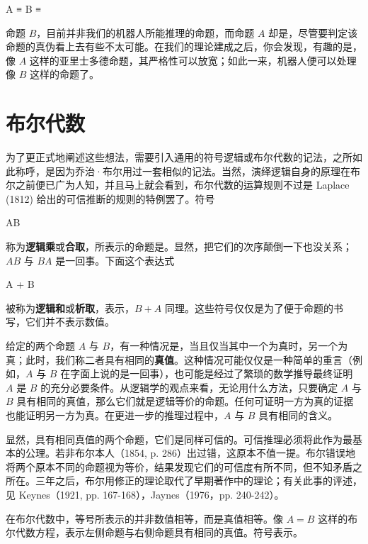 \startformula
\startalign
\NC A \NC ≡ \NR
\NC B \NC ≡ \NR
\stopalign
\stopformula

命题 $B$，目前并非我们的机器人所能推理的命题，而命题 $A$ 却是，尽管要判定该命题的真伪看上去有些不太可能。在我们的理论建成之后，你会发现，有趣的是，像 $A$ 这样的亚里士多德命题，其严格性可以放宽；如此一来，机器人便可以处理像 $B$ 这样的命题了。

\section{布尔代数}

为了更正式地阐述这些想法，需要引入通用的符号逻辑或布尔代数的记法，之所如此称呼，是因为乔治·布尔用过一套相似的记法。当然，演绎逻辑自身的原理在布尔之前便已广为人知，并且马上就会看到，布尔代数的运算规则不过是 Laplace (1812) 给出的可信推断的规则的特例罢了。符号

\placeformula
\startformula
AB
\stopformula

称为{\bf 逻辑乘}或{\bf 合取}，所表示的命题是。显然，把它们的次序颠倒一下也没关系；$AB$ 与 $BA$ 是一回事。下面这个表达式

\placeformula
\startformula
A + B
\stopformula

被称为{\bf 逻辑和}或{\bf 析取}，表示，$B + A$ 同理。这些符号仅仅是为了便于命题的书写，它们并不表示数值。

给定的两个命题 $A$ 与 $B$，有一种情况是，当且仅当其中一个为真时，另一个为真；此时，我们称二者具有相同的{\bf 真值}。这种情况可能仅仅是一种简单的重言（例如，$A$ 与 $B$ 在字面上说的是一回事），也可能是经过了繁琐的数学推导最终证明 $A$ 是 $B$ 的充分必要条件。从逻辑学的观点来看，无论用什么方法，只要确定 $A$ 与 $B$ 具有相同的真值，那么它们就是逻辑等价的命题。任何可证明一方为真的证据也能证明另一方为真。在更进一步的推理过程中，$A$ 与 $B$ 具有相同的含义。

显然，具有相同真值的两个命题，它们是同样可信的。可信推理必须将此作为最基本的公理。若非布尔本人（1854, p. 286）出过错，这原本不值一提。布尔错误地将两个原本不同的命题视为等价，结果发现它们的可信度有所不同，但不知矛盾之所在。三年之后，布尔用修正的理论取代了早期著作中的理论；有关此事的评述，见 Keynes（1921, pp. 167-168），Jaynes（1976，pp. 240-242）。

在布尔代数中，等号所表示的并非数值相等，而是真值相等。像 $A = B$ 这样的布尔代数方程，表示左侧命题与右侧命题具有相同的真值。符号\quotation{$\equiv$}表示。

